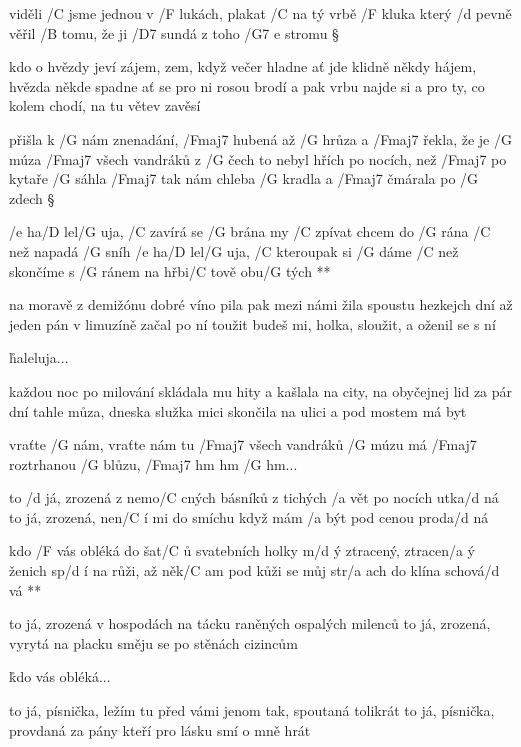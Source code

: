 viděli /C jsme jednou v /F lukách, plakat /C na tý vrbě /F kluka
který /d pevně věřil /B tomu, že ji /D7 sundá z toho /{G7 e} stromu \S

kdo o hvězdy jeví zájem, zem, když večer hladne
ať jde klidně někdy hájem, hvězda někde spadne
ať se pro ni rosou brodí a pak vrbu najde si
a pro ty, co kolem chodí, na tu větev zavěsí




přišla k /G nám znenadání, /Fmaj7 hubená až /G hrůza
a /Fmaj7 řekla, že je /G múza /Fmaj7 všech vandráků z /G čech
to nebyl hřích po nocích, než /Fmaj7 po kytaře /G sáhla
/Fmaj7 tak nám chleba /G kradla a /Fmaj7 čmárala po /G zdech \S

\R  /e ha/D lel/G uja, /C zavírá se /G brána
    my /C zpívat chcem do /G rána
    /C než napadá /G sníh
    /e ha/D lel/G uja, /C kteroupak si /G dáme
    /C než skončíme s /G ránem
    na hřbi/C tově obu/G tých **

na moravě z demižónu dobré víno pila
pak mezi námi žila spoustu hezkejch dní
až jeden pán v limuzíně začal po ní toužit
budeš mi, holka, sloužit, a oženil se s ní

\r haleluja...

každou noc po milování skládala mu hity
a kašlala na city, na obyčejnej lid
za pár dní tahle můza, dneska služka mici
skončila na ulici a pod mostem má byt

\rr

vraťte /G nám, vraťte nám tu /Fmaj7 všech vandráků /G múzu
má /Fmaj7 roztrhanou /G blůzu, /Fmaj7 hm hm /G hm...




to /d já, zrozená z nemo/C cných básníků
z tichých /a vět po nocích utka/d ná
to já, zrozená, nen/C í mi do smíchu
když mám /a být pod cenou proda/d ná

\R  kdo /F vás obléká do šat/C ů svatebních
    holky m/d ý ztracený, ztracen/a ý
    ženich sp/d í na růži, až něk/C am pod kůži
    se můj str/a ach do klína schová/d vá **

to já, zrozená v hospodách na tácku
raněných ospalých milenců
to já, zrozená, vyrytá na placku
směju se po stěnách cizincům

\r kdo vás obléká...

to já, písnička, ležím tu před vámi
jenom tak, spoutaná tolikrát
to já, písnička, provdaná za pány
kteří pro lásku smí o mně hrát

